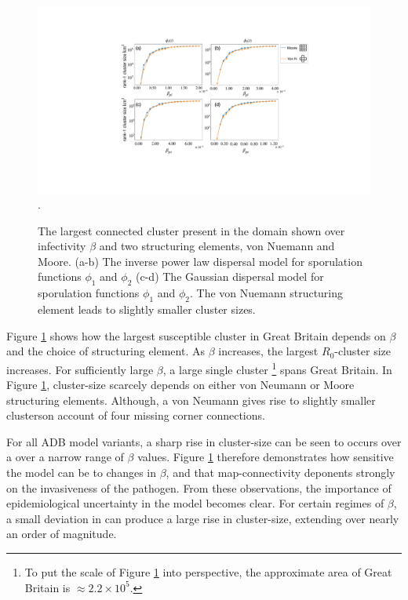 \begin{figure}
    \centering
    \includegraphics[scale=0.45]{chapter6/figures/fig6-largest-cluster-over-beta.pdf}.
    \caption{The largest connected cluster present in the domain shown over infectivity $\beta$ and two structuring elements, von Nuemann and Moore. (a-b) The inverse power law dispersal model for sporulation functions $\phi_1$ and $\phi_2$ (c-d) The Gaussian dispersal model for sporulation functions $\phi_1$ and $\phi_2$. The von Nuemann structuring element leads to slightly smaller cluster sizes.}
    \label{fig6:largest-cluster-over-beta}
\end{figure}

Figure \ref{fig6:largest-cluster-over-beta} shows how the largest susceptible cluster in Great Britain depends on $\beta$ and the choice of structuring element. 
As $\beta$ increases, the largest $R_0$-cluster size increases. 
For sufficiently large $\beta$, a large single cluster
\footnote{To put the scale of Figure \ref{fig6:largest-cluster-over-beta} into perspective, the approximate area of Great Britain is $\approx 2.2 \times 10^5$.} 
spans Great Britain. 
In Figure \ref{fig6:largest-cluster-over-beta}, cluster-size scarcely depends on either von Neumann or Moore structuring elements. 
Although, a von Neumann gives rise to slightly smaller clusters\textemdash on account of four missing corner connections. 

For all ADB model variants, a sharp rise in cluster-size can be seen to occurs over a over a narrow range of $\beta$ values.
Figure \ref{fig6:largest-cluster-over-beta} therefore demonstrates how sensitive the model can be to changes in $\beta$, and that map-connectivity deponents strongly on the invasiveness of the pathogen.
From these observations, the importance of epidemiological uncertainty in the model becomes clear.
For certain regimes of $\beta$, a small deviation in can produce a large rise in cluster-size, extending over nearly an order of magnitude.

